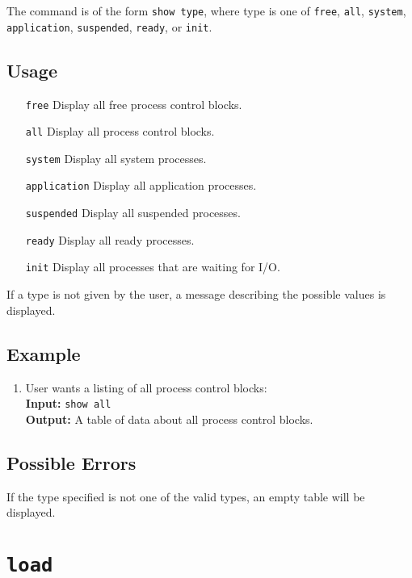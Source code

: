 The command is of the form {\tt show type}, where type is one of {\tt free}, {\tt all},
{\tt system}, {\tt application}, {\tt suspended}, {\tt ready}, or {\tt init}.

\subsection{Usage}

\begin{enumerate}
    \item[{\tt free}] Display all free process control blocks.
    \item[{\tt all}] Display all process control blocks.
    \item[{\tt system}] Display all system processes.
    \item[{\tt application}] Display all application processes.
    \item[{\tt suspended}] Display all suspended processes.
    \item[{\tt ready}] Display all ready processes.
    \item[{\tt init}] Display all processes that are waiting for I/O.
\end{enumerate}

If a type is not given by the user, a message describing the possible values is displayed.

\subsection{Example}
\begin{enumerate}
    \item User wants a listing of all process control blocks: \\
        {\bf Input:} {\tt show all} \\
        {\bf Output:} A table of data about all process control blocks.
\end{enumerate}
\subsection{Possible Errors}

If the type specified is not one of the valid types, an empty table will be displayed.







\section{\tt load}
\label{load_cmd}

